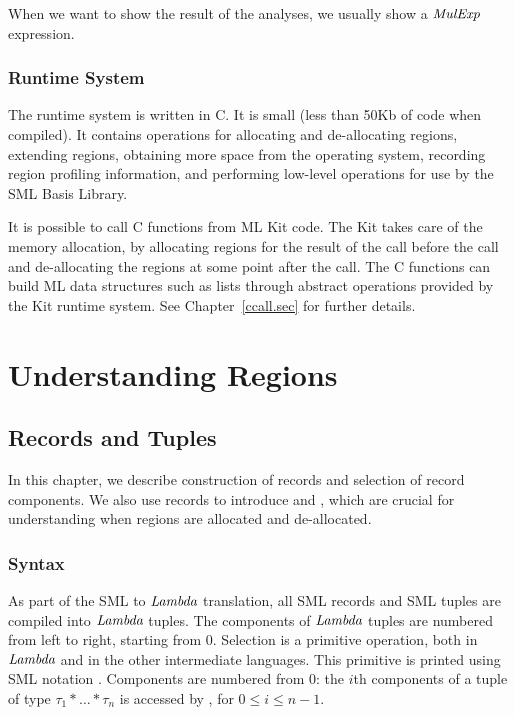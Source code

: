 \documentclass[12pt]{book}
\begin{document}
When we want to show the result of the analyses, we usually show a $\hbox{\it MulExp}$ expression.

\section{Runtime System}
The runtime system is written in C. It is small (less than 50Kb 
of code when compiled).
It contains operations for allocating and de-allocating regions, extending regions,
obtaining more space from the operating system, recording region profiling information, and performing
low-level operations for use by the SML Basis Library.

It is possible to call C functions from ML Kit code.
The Kit takes care of the memory allocation, by allocating regions for
the result of the call before the call and de-allocating the regions
at some point after the call. The C functions can build ML data
structures such as lists through abstract operations provided by the
Kit runtime system. See Chapter~\ref{ccall.sec} for further details.

\part{Understanding Regions}
\label{understanding.sec}
\chapter{Records and Tuples}
In this chapter, we describe construction of records and selection of record
components. We also use records to introduce   and , which are crucial for understanding when regions are allocated
and de-allocated.
\section{Syntax}
As part of the SML to $\hbox{\it Lambda}$ translation, all SML records and SML tuples are compiled into
$\hbox{\it Lambda}$ tuples. The components of $\hbox{\it Lambda}$ tuples are numbered from left to right, starting from 0.
Selection is a primitive operation, both in $\hbox{\it Lambda}$ and in the other
intermediate languages. This primitive is printed using SML notation 
. Components are numbered from 0: the $i$th components of
a tuple of type $\tau_1\ast\ldots\ast\tau_n$ is accessed by
, for $0\leq i\leq n-1$. 
\end{document}
